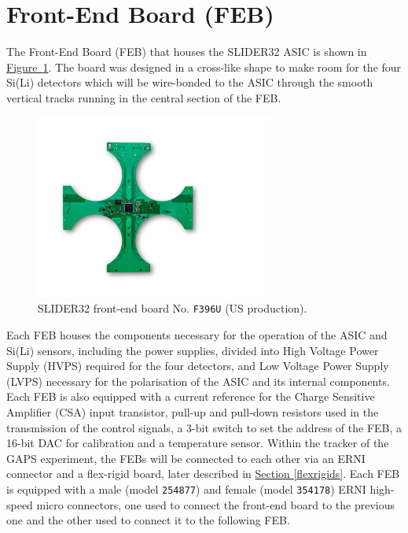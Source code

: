 
\section{Front-End Board (FEB)} \label{sec21}

\par
The Front-End Board (FEB) that houses the SLIDER32 ASIC is shown in \mbox{\hyperref[figFEBimage]{Figure \ref{figFEBimage}}}. The board was designed in a cross-like shape to make room for the four Si(Li) detectors which will be wire-bonded to the ASIC through the smooth vertical tracks running in the central section of the FEB.

\begin{figure}[ht]
    \centering
    \includegraphics[width=0.7\textwidth]{Images/chap2/FEB_immagine.pdf}
    \caption{SLIDER32 front-end board No. \texttt{F396U} (US production).}
    \label{figFEBimage}
\end{figure}

\par
Each FEB houses the components necessary for the operation of the ASIC and Si(Li) sensors, including the power supplies, divided into High Voltage Power Supply (HVPS) required for the four detectors, and Low Voltage Power Supply (LVPS) necessary for the polarisation of the ASIC and its internal components. Each FEB is also equipped with a current reference for the Charge Sensitive Amplifier (CSA) input transistor, pull-up and pull-down resistors used in the transmission of the control signals, a 3-bit switch to set the address of the FEB, a 16-bit DAC for calibration and a temperature sensor. Within the tracker of the GAPS experiment, the FEBs will be connected to each other via an ERNI connector and a flex-rigid board, later described in \hyperref[flexrigids]{Section \ref{flexrigids}}. Each FEB is equipped with a male (model \texttt{254877}) and female (model \texttt{354178}) ERNI high-speed micro connectors, one used to connect the front-end board to the previous one and the other used to connect it to the following FEB.

